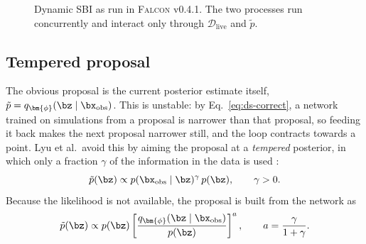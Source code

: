 \begin{figure}[t]
\centering
{}
\caption{Dynamic SBI as run in \textsc{Falcon} v0.4.1. The two processes run
concurrently and interact only through $\mathcal{D}_{\mathrm{live}}$ and
$\tilde p$.}
\label{fig:ds-loop}
\end{figure}

\subsection{Tempered proposal}
\label{sec:ds-temper}

The obvious proposal is the current posterior estimate itself,
$\tilde p=q_{\bm{\phi}}(\bz\mid\bx_{\mathrm{obs}})$. This is unstable: by
Eq.~\eqref{eq:ds-correct}, a network trained on simulations from a proposal
is narrower than that proposal, so feeding it back makes the next proposal
narrower still, and the loop contracts towards a point. Lyu et al.\ avoid this
by aiming the proposal at a \emph{tempered} posterior, in which only a
fraction $\gamma$ of the information in the data is used
\citep[][their Eq.~7]{lyu_dynamic_2026}:
\begin{equation}
    \tilde p(\bz)\propto p(\bx_{\mathrm{obs}}\mid\bz)^{\gamma}\,p(\bz),
    \qquad \gamma>0.
    \label{eq:ds-temper}
\end{equation}
Because the likelihood is not available, the proposal is built from the
network as
\begin{equation}
    \tilde p(\bz)\propto p(\bz)\left[\frac{q_{\bm{\phi}}(\bz\mid\bx_{\mathrm{obs}})}{p(\bz)}\right]^{a},
    \qquad a=\frac{\gamma}{1+\gamma}.
    \label{eq:ds-ansatz}
\end{equation}

